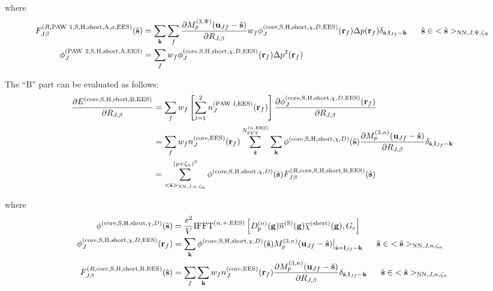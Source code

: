 \documentclass[paper=a4, fontsize=11pt]{article} %
\numberwithin{equation}{section} %
\numberwithin{figure}{section} %
\numberwithin{table}{section} %
\newcommand{\p}{\partial}
\newcommand{\ol}{\overline}
\newcommand{\bu}{{\bf{u}}}
\newcommand{\bl}{{\bf{l}}}
\newcommand{\bk}{{\bf{k}}}
\newcommand{\bs}{{\bf{s}}}
\newcommand{\bg}{{\bf{g}}}
\newcommand{\br}{{\bf{r}}}
\newcommand{\hs}{{\hat{\bf{s}}}}
\newcommand{\rS}{{\mathrm{S}}}
\newcommand{\rEES}{{\mathrm{EES}}}
\newcommand{\rcore}{{\mathrm{core}}}
\newcommand{\rNN}{{\mathrm{NN}}}
\newcommand{\rshort}{{\mathrm{short}}}
\newcommand{\rP}{{\mathrm{PAW}}}
\newcommand{\rH}{{\mathrm{H}}}
\newcommand{\rA}{{\mathrm{A}}}
\newcommand{\rB}{{\mathrm{B}}}
\newcommand{\RJb}{{R_{J,\beta}}}
\newcommand{\NFFTnEES}{{N^{(n,\rEES)}_{\mathrm{FFT}}}}
\newcommand{\Gc}{{G_{\mathrm{c}}}}
\newcommand{\Dng}{{D^{(n)}_p(\bg)}}
\newcommand{\Mn}{{M_p^{(3,n)}}}
\newcommand{\Mp}{{M_p^{(3,\Psi)}}}
\newcommand{\IFFTnEES}{{\mathrm{IFFT}^{(n,+,\rEES)}}}
\newcommand{\pzn}{{(p+\zeta_n)^3}}
\newcommand{\hsJp}{{<\hs>_{\rNN,J,\Psi,\zeta_\Psi}}}
\newcommand{\hsJn}{{<\hs>_{\rNN,J,n,\zeta_n}}}
\newcommand{\hsinJp}{{\ \ \ \ \ \hs  \in  \hsJp}}
\newcommand{\hsinJn}{{\ \ \ \ \ \hs  \in  \hsJn}}
\begin{document}
where
\begin{equation}
\begin{split}
F_{J\beta}^{(R,\rP\ 1,\rS,\rH,\rshort,\rA,a,\rEES)}(\hs)
&= \sum_{\bk}\sum_f  \frac{\p \Mp(\bu_{Jf}-\hat \bs)}{\p \RJb}w_f \phi_J^{(\rcore,\rS,\rH,\rshort,\chi,D,\rEES)}(\br_f)\Delta p(\br_f)\delta_{\hat \bs,\bl_{Jf}-\bk} \hsinJp\\
\phi_J^{(\rP\ 2,\rS,\rH,\rshort,\rA,\rEES)} &= \sum_f w_f \phi_J^{(\rcore,\rS,\rH,\rshort,\chi,D,\rEES)}(\br_f)\Delta p^2(\br_f) \\
\end{split}
\end{equation}



The ``$\rB$'' part can be evaluated as follows:
\begin{equation}
\begin{split}
\frac{\p E^{(\rcore,\rS,\rH,\rshort,\rB,\rEES)}}{\p \RJb}
&= \sum_f w_f \left[\sum_{l=1}^2 n_J^{(\rP\ l,\rEES)}(\br_f)\right] \frac{\p \phi_J^{(\rcore,\rS,\rH,\rshort,\chi,D,\rEES)}(\br_f)}{\p \RJb}\\
&= \sum_f w_f n_J^{(\rcore,\rEES)}(\br_f) \sum_{\hat \bs}^\NFFTnEES  \sum_{\bk} \phi^{(\rcore,\rS,\rH,\rshort,\chi,D)}(\hs)\frac{\p \Mn(\bu_{Jf}-\hat \bs)}{\p \RJb}\delta_{\hat \bs,\bl_{Jf}-\bk}\\
&= \sum_{\hsJn}^{\pzn} \phi^{(\rcore,\rS,\rH,\rshort,\chi,D)}(\hs)F_{J\beta}^{(R,\rcore,\rS,\rH,\rshort,\rB,\rEES)}(\hs)\\
\end{split}
\end{equation}

where
\begin{equation}
\begin{split}
\phi^{(\rcore,\rS,\rH,\rshort,\chi,D)}(\hs)&=\frac{e^2}{V} \IFFTnEES\left[\Dng \ol n^{(\rS)}(\bg)\ol \chi^{(\rshort)}(\bg),\Gc\right]\\
\phi_J^{(\rcore,\rS,\rH,\rshort,\chi,D,\rEES)}(\br_f) &=\sum_{\bk} \phi^{(\rcore,\rS,\rH,\rshort,\chi,D)}(\hs)\Mn(\bu_{Jf}-\hat \bs)\big|_{\hs=\bl_{Jf}-\bk} \hsinJn\\
F_{J\beta}^{(R,\rcore,\rS,\rH,\rshort,\rB,\rEES)}(\hs)
&=\sum_f \sum_{\bk}w_f n_J^{(\rcore,\rEES)}(\br_f) \frac{\p \Mn(\bu_{Jf}-\hat \bs)}{\p \RJb}\delta_{\hat \bs,\bl_{Jf}-\bk} \hsinJn \\
\end{split}
\end{equation}
\end{document}

